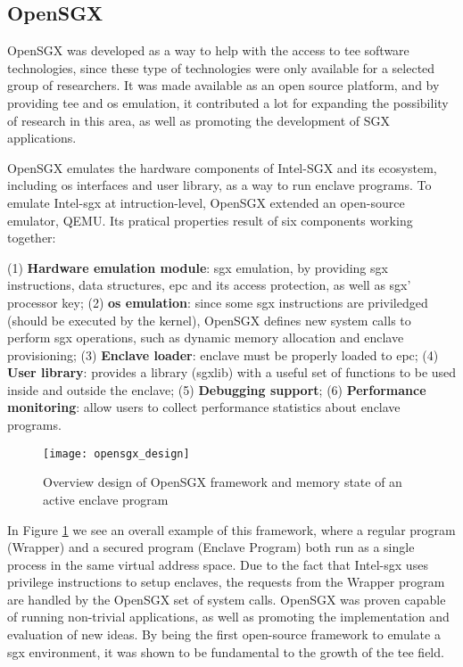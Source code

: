 \subsection{OpenSGX}
\label{ssec:openSGX}

OpenSGX \cite{opensgx_paper} was developed as a way to help with the access to \gls{tee} software technologies, since these type of technologies were only available for a selected group of researchers. 
It was made available as an open source platform, and by providing \gls{tee} and \gls{os} emulation, it contributed a lot for expanding the possibility of research in this area, as well as promoting the development of SGX applications. 

OpenSGX emulates the hardware components of Intel-SGX and its ecosystem, including \gls{os} interfaces and user library, as a way to run enclave programs. To emulate Intel-\gls{sgx} at intruction-level, OpenSGX extended an open-source emulator, QEMU.
Its pratical properties result of six components working together: 

(1) \textbf{Hardware emulation module}: \gls{sgx} emulation, by providing \gls{sgx} instructions, data structures, \gls{epc} and its access protection, as well as \gls{sgx}' processor key; 
(2) \textbf{\gls{os} emulation}: since some \gls{sgx} instructions are priviledged (should be executed by the kernel), OpenSGX defines new system calls to perform \gls{sgx} operations, such as dynamic memory allocation and enclave provisioning; 
(3) \textbf{Enclave loader}: enclave must be properly loaded to \gls{epc}; 
(4) \textbf{User library}: provides a library (sgxlib) with a useful set of functions to be used inside and outside the enclave; 
(5) \textbf{Debugging support}; 
(6) \textbf{Performance monitoring}: allow users to collect performance statistics about enclave programs.

\begin{figure}[htbp]
	\centering
	{\texttt{[image: opensgx\_design]}}
	\caption{Overview design of OpenSGX framework and memory state of an active enclave program}
	\label{fig:openSGXDesign}
\end{figure}

In Figure \ref{fig:openSGXDesign} we see an overall example of this framework, where a regular program (Wrapper) and a secured program (Enclave Program) both run as a single process in the same virtual address space. Due to the fact that Intel-\gls{sgx} uses privilege instructions to setup enclaves, the requests from the Wrapper program are handled by the OpenSGX set of system calls.
OpenSGX was proven capable of running non-trivial applications, as well as promoting the implementation and evaluation of new ideas. By being the first open-source framework to emulate a \gls{sgx} environment, it was shown to be fundamental to the growth of the \gls{tee} field.



